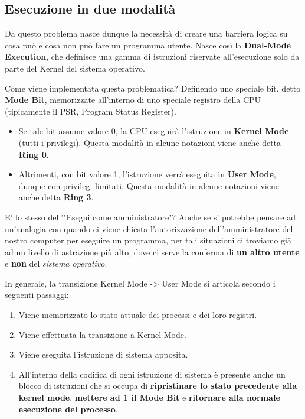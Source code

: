 \documentclass[12pt]{report}
\begin{document}
	\subsection{Esecuzione in due modalità}
	Da questo problema nasce dunque la necessità di creare una barriera logica su cosa può e cosa non può fare un programma utente. Nasce così la \textbf{Dual-Mode Execution}, che definisce una gamma di istruzioni riservate all'esecuzione solo da parte del Kernel del sistema operativo.
	
	Come viene implementata questa problematica? Definendo uno speciale bit, detto \textbf{Mode Bit}, memorizzate all'interno di uno speciale registro della CPU (tipicamente il PSR, Program Status Register).
	\begin{itemize}
		\item Se tale bit assume valore 0, la CPU eseguirà l'istruzione in \textbf{Kernel Mode} (tutti i privilegi). Questa modalità in alcune notazioni viene anche detta \textbf{Ring 0}.
		
		\item Altrimenti, con bit valore 1, l'istruzione verrà eseguita in \textbf{User Mode}, dunque con privilegi limitati. Questa modalità in alcune notazioni viene anche detta \textbf{Ring 3}.
	\end{itemize}
	
	\begin{osservazione}{E' lo stesso dell'"Esegui come amministratore"?}{}
		Anche se si potrebbe pensare ad un'analogia con quando ci viene chiesta l'autorizzazione dell'amministratore del nostro computer per eseguire un programma, per tali situazioni ci troviamo già ad un livello di astrazione più alto, dove ci serve la conferma di \textbf{un altro utente} e \textbf{non} del \textit{sistema operativo}.
	\end{osservazione}
	
	In generale, la transizione Kernel Mode -> User Mode si articola secondo i seguenti passaggi:
	\begin{enumerate}
		\item Viene memorizzato lo stato attuale dei processi e dei loro registri.
		
		\item Viene effettuata la transizione a Kernel Mode.
		
		\item Viene eseguita l'istruzione di sistema apposita.
		
		\item All'interno della codifica di ogni istruzione di sistema è presente anche un blocco di istruzioni che si occupa di \textbf{ripristinare lo stato precedente alla kernel mode}, \textbf{mettere ad 1 il Mode Bit} e \textbf{ritornare alla normale esecuzione del processo}.
	\end{enumerate}
	
\end{document}
